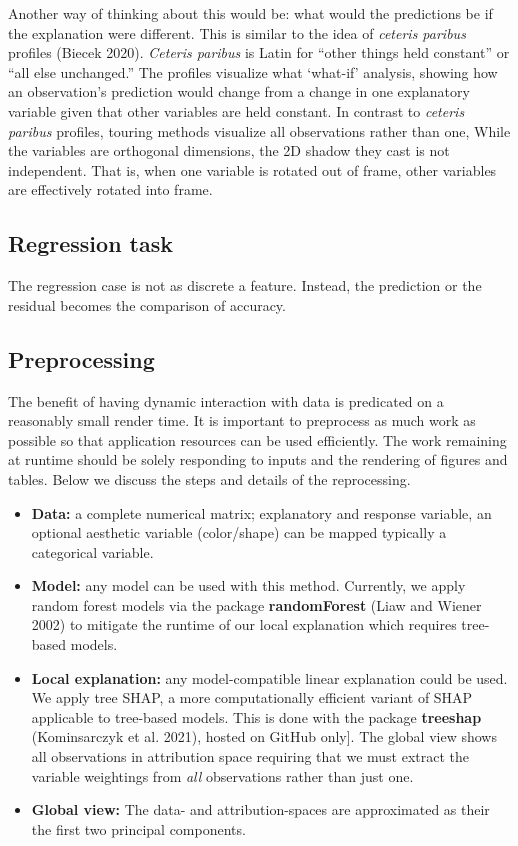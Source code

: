 \documentclass[
]{article}
\begin{document}
Another way of thinking about this would be: what would the predictions be if the explanation were different. This is similar to the idea of \emph{ceteris paribus} profiles (Biecek 2020). \emph{Ceteris paribus} is Latin for ``other things held constant'' or ``all else unchanged.'' The profiles visualize what `what-if' analysis, showing how an observation's prediction would change from a change in one explanatory variable given that other variables are held constant. In contrast to \emph{ceteris paribus} profiles, touring methods visualize all observations rather than one, While the variables are orthogonal dimensions, the 2D shadow they cast is not independent. That is, when one variable is rotated out of frame, other variables are effectively rotated into frame.

\hypertarget{regression-task}{%
\subsection{Regression task}\label{regression-task}}

The regression case is not as discrete a feature. Instead, the prediction or the residual becomes the comparison of accuracy.

\hypertarget{preprocessing}{%
\subsection{Preprocessing}\label{preprocessing}}

The benefit of having dynamic interaction with data is predicated on a reasonably small render time. It is important to preprocess as much work as possible so that application resources can be used efficiently. The work remaining at runtime should be solely responding to inputs and the rendering of figures and tables. Below we discuss the steps and details of the reprocessing.




\begin{itemize}
    \item \textbf{Data:} a complete numerical matrix; explanatory and response variable, an optional aesthetic variable (color/shape)  can be mapped typically a categorical variable.
    \item \textbf{Model:} any model can be used with this method. Currently, we apply random forest models via the package \textbf{randomForest} (Liaw and Wiener 2002) to mitigate the runtime of our local explanation which requires tree-based models.
    \item \textbf{Local explanation:} any model-compatible linear explanation could be used. We apply tree SHAP, a more computationally efficient variant of SHAP applicable to tree-based models. This is done with the package \textbf{treeshap} (Kominsarczyk et al. 2021), hosted on GitHub only]. The global view shows all observations in attribution space requiring that we must extract the variable weightings from \emph{all} observations rather than just one.
    \item \textbf{Global view:} The data- and attribution-spaces are approximated as their the first two principal components.
\end{itemize}
\end{document}
